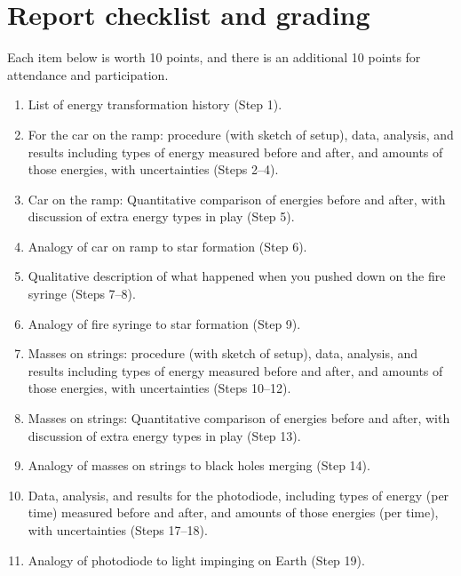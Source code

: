 \section{Report checklist and grading}

Each item below is worth 10 points, and there is an additional 10 points for attendance and participation.

\begin{enumerate}
	\item List of energy transformation history (Step 1).
	
	\item For the car on the ramp: procedure (with sketch of setup), data, analysis, and results including types of energy measured before and after, and amounts of those energies, with uncertainties (Steps 2--4).
	
	\item Car on the ramp: Quantitative comparison of energies before and after, with discussion of extra energy types in play (Step 5).
	
	\item Analogy of car on ramp to star formation (Step 6).
	
	\item Qualitative description of what happened when you pushed down on the fire syringe (Steps 7--8).
	
	\item Analogy of fire syringe to star formation (Step 9).
	
	\item Masses on strings: procedure (with sketch of setup), data, analysis, and results including types of energy measured before and after, and amounts of those energies, with uncertainties (Steps 10--12).
	
	\item Masses on strings: Quantitative comparison of energies before and after, with discussion of extra energy types in play (Step 13).
	
	\item Analogy of masses on strings to black holes merging (Step 14).
	
	\item Data, analysis, and results for the photodiode, including types of energy (per time) measured before and after, and amounts of those energies (per time), with uncertainties (Steps 17--18).
	
	\item Analogy of photodiode to light impinging on Earth (Step 19).
\end{enumerate}